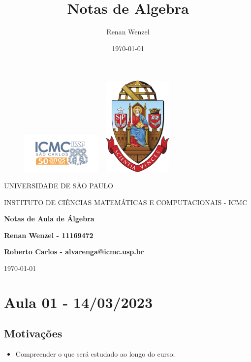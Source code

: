 \documentclass{article}
\title{Notas de Algebra}
\author{Renan Wenzel}
\date{\today}
\begin{document}
 \begin{figure}[ht]
		\includegraphics[width=4cm]{icmc.png}
		\hspace{7cm}
		\includegraphics[height=4.9cm,width=4cm]{brasao_usp_cor.jpg}
	\endminipage	
\end{figure}

\begin{center}
	\vspace{1cm}
	\LARGE
	UNIVERSIDADE DE S\~AO PAULO

	\vspace{1.3cm}
	\LARGE
	INSTITUTO DE CI\^ENCIAS MATEM\'ATICAS E COMPUTACIONAIS - ICMC

	\vspace{1.7cm}
	\Large
	\textbf{Notas de Aula de \'Algebra}

	\vspace{1.3cm}
	\large
	\textbf{Renan Wenzel - 11169472}

	\vspace{1.3cm}
	\large
	\textbf{Roberto Carlos - alvarenga@icmc.usp.br}

	\vspace{1.3cm}
	\today
\end{center}

 \newpage

 \tableofcontents

 \newpage

\section{Aula 01 - 14/03/2023}
\subsection{Motiva\c c\~oes}
\begin{itemize}
  \item Compreender o que ser\'a estudado ao longo do curso;
\end{itemize}
\end{document}
